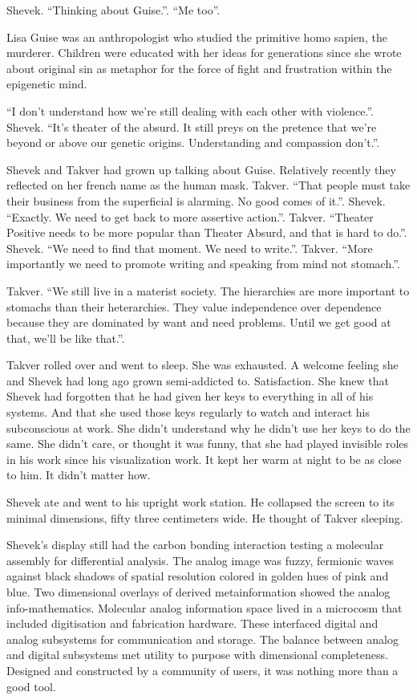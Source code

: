Shevek.  ``Thinking about Guise.''.  ``Me too''.

Lisa Guise was an anthropologist who studied the primitive homo
sapien, the murderer.  Children were educated with her ideas for
generations since she wrote about original sin as metaphor for the
force of fight and frustration within the epigenetic mind.

``I don't understand how we're still dealing with each other with
violence.''.  Shevek.  ``It's theater of the absurd.  It still preys
on the pretence that we're beyond or above our genetic origins.
Understanding and compassion don't.''.

Shevek and Takver had grown up talking about Guise.  Relatively
recently they reflected on her french name as the human mask.  Takver.
``That people must take their business from the superficial is
alarming.  No good comes of it.''.  Shevek.  ``Exactly.  We need to
get back to more assertive action.''.  Takver.  ``Theater Positive
needs to be more popular than Theater Absurd, and that is hard to
do.''.  Shevek.  ``We need to find that moment.  We need to write.''.
Takver.  ``More importantly we need to promote writing and speaking
from mind not stomach.''.

Takver.  ``We still live in a materist society.  The hierarchies are
more important to stomachs than their heterarchies.  They value
independence over dependence because they are dominated by want and
need problems.  Until we get good at that, we'll be like that.''.

Takver rolled over and went to sleep.  She was exhausted.  A welcome
feeling she and Shevek had long ago grown semi-addicted to.
Satisfaction.  She knew that Shevek had forgotten that he had given
her keys to everything in all of his systems.  And that she used those
keys regularly to watch and interact his subconscious at work.  She
didn't understand why he didn't use her keys to do the same.  She
didn't care, or thought it was funny, that she had played invisible
roles in his work since his visualization work.  It kept her warm at
night to be as close to him.  It didn't matter how.

Shevek ate and went to his upright work station.  He collapsed the
screen to its minimal dimensions, fifty three centimeters wide.  He
thought of Takver sleeping.

Shevek's display still had the carbon bonding interaction testing a
molecular assembly for differential analysis.  The analog image was
fuzzy, fermionic waves against black shadows of spatial resolution
colored in golden hues of pink and blue.  Two dimensional overlays of
derived metainformation showed the analog info-mathematics.  Molecular
analog information space lived in a microcosm that included
digitisation and fabrication hardware.  These interfaced digital and
analog subsystems for communication and storage.  The balance between
analog and digital subsystems met utility to purpose with dimensional
completeness.  Designed and constructed by a community of users, it
was nothing more than a good tool.

